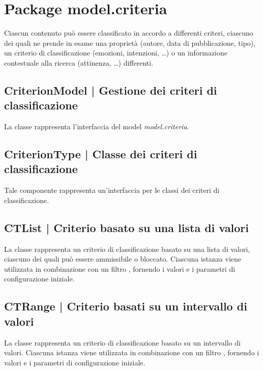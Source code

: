 \documentclass[10pt,a4paper,headinclude,footinclude,hidelinks]{scrreprt} %
\begin{document}
	\section{Package model.criteria}
	\label{sec:stage:design:sistema:model.criteria}
	Ciascun contenuto può essere classificato in accordo a differenti criteri, ciascuno dei quali ne prende in esame una proprietà (autore, data di pubblicazione, tipo), un criterio di classificazione (emozioni, intenzioni, \ldots) o un informazione contestuale alla ricerca (attinenza, \ldots) differenti.

	\subsection[CriterionModel]{CriterionModel | Gestione dei criteri di classificazione}
	\label{sec:stage:design:sistema:model.criteria:criteria-model}
	La classe \textit{} rappresenta l'interfaccia del model \textit{model.criteria}.

	\subsection[CriterionType]{CriterionType | Classe dei criteri di classificazione}
	\label{sec:stage:design:sistema:model.criteria:criteria}
	Tale componente rappresenta un'interfaccia per le classi dei criteri di classificazione.

	\subsection[CTList]{CTList | Criterio basato su una lista di valori}
	\label{sec:stage:design:sistema:model.criteria:list-criterion}
	La classe \textit{} rappresenta un criterio di classificazione basato su una lista di valori, ciascuno dei quali può essere ammissibile o bloccato. Ciascuna istanza viene utilizzata in combinazione con un filtro \textit{}, fornendo i valori e i parametri di configurazione iniziale.

	\subsection[CTRange]{CTRange | Criterio basati su un intervallo di valori}
	\label{sec:stage:design:sistema:model.criteria:range-criterion}
	La classe \textit{} rappresenta un criterio di classificazione basato su un intervallo di valori. Ciascuna istanza viene utilizzata in combinazione con un filtro \textit{}, fornendo i valori e i parametri di configurazione iniziale.
\end{document}
